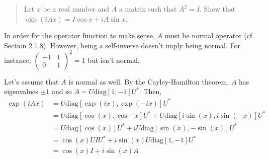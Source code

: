 \begingroup
\newcommand{\diag}[1]{\mathrm{diag} \left[ #1 \right]}
\newcommand{\diags}[2]{\mathrm{diag} \left[ #1, #2 \right]}
\newcommand{\expo}[1]{\exp \left( #1 \right)}
\newcommand{\coso}[1]{\cos \left( #1 \right)}
\newcommand{\sino}[1]{\sin \left( #1 \right)}

\par \begin{quote} Let $x$ be a real number and $A$ a matrix such that $A^2 = I$.
%
Show that $\expo{i A x} = I \cos x + i A \sin x$. \end{quote}
%
\par In order for the operator function to make sense, $A$ must be normal operator (cf. Section 2.1.8).
%
However, being a self-inverse doesn't imply being normal.
%
For instance, $\begin{pmatrix} -1 & 1 \\ 0 & 1 \end{pmatrix}^2 = 1$ but isn't normal.
%
\par Let's assume that $A$ is normal as well.
%
By the Cayley-Hamilton theorem, $A$ has eigenvalues $\pm 1$ and so $A = U \diags{1}{-1} U^*$.
%
Then,
%
\begin{align}
\expo{i A x} &= U \diags{\expo{i x}}{\expo{-i x}} U^* \\
&= U \diags{\coso{x}}{\cos{-x}} U^* + U \diags{i \sino{x}}{i \sino{-x}} U^* \\
&= U \diag{\coso{x}} U^* + i U \diags{\sino{x}}{-\sino{x}} U^* \\
&= \coso{x} U I U^* + i \sino{x} U \diags{1}{-1} U^* \\
&= \coso{x} I + i \sino{x} A
\end{align}
\endgroup
